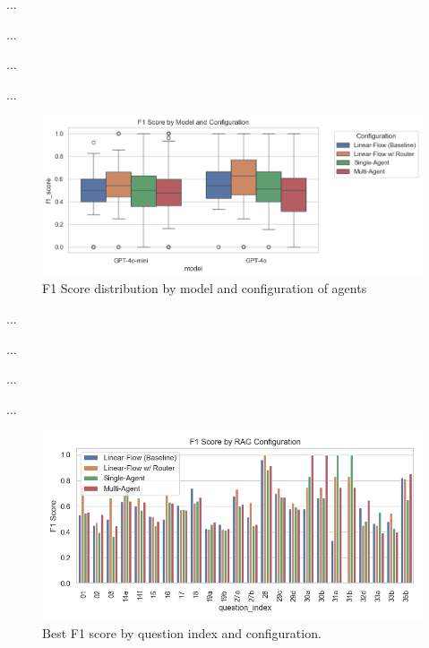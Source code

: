                 
                ...

                ...

                ...

                ...
                
                \begin{figure}
                    \includegraphics[width=1.1\linewidth]{images_exp2/f1_score_by_model_and_configuration.png}
                    \caption{F1 Score distribution by model and configuration of agents}
                    \label{fig:f1_score_by_model_and_configuration}
                \end{figure}
                    
                ...

                ...

                ...

                ...
                
                
                \begin{figure}
                    \centering
                    \includegraphics[width=1\linewidth]{images_exp2/best_f1_by_question_index_and_configuration.png}
                    \caption{Best F1 score by question index and configuration.}
                    \label{fig:best_f1_by_question_index_and_configuration}
                \end{figure}
                
